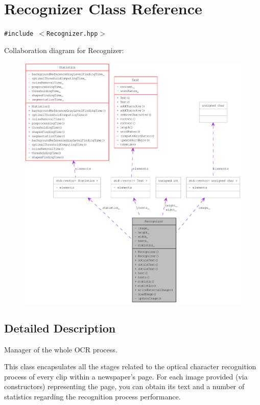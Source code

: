 \hypertarget{class_recognizer}{
\section{Recognizer Class Reference}
\label{class_recognizer}
}
{\tt \#include $<$Recognizer.hpp$>$}

Collaboration diagram for Recognizer:\nopagebreak
\begin{figure}[H]
\begin{center}
\leavevmode
\includegraphics[width=400pt]{class_recognizer__coll__graph}
\end{center}
\end{figure}


\subsection{Detailed Description}
Manager of the whole OCR process. 

This class encapsulates all the stages related to the optical character recognition process of every clip within a newspaper's page. For each image provided (via constructors) representing the page, you can obtain its text and a number of statistics regarding the recognition process performance.

